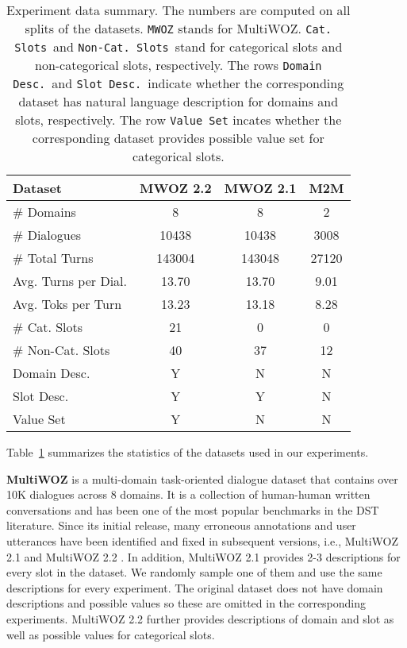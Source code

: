 \documentclass[11pt]{article}
\begin{document}
\begin{table}[t]
    \small
    \centering
    \begin{tabular}{l@{\hskip3pt}c@{\hskip3pt}cc}
    \toprule
        Dataset &  MWOZ 2.2 &  MWOZ 2.1 & M2M  \\
        \midrule
        \# Domains & 8 & 8 & 2 \\
        \# Dialogues & 10438 & 10438 & 3008 \\
        \# Total Turns & 143004 & 143048  & 27120 \\
         Avg. Turns per Dial. & 13.70 & 13.70  & 9.01 \\   
         Avg. Toks per Turn & 13.23 & 13.18  & 8.28 \\   
        \# Cat. Slots & 21 & 0 & 0\\ 
        \# Non-Cat. Slots  & 40 & 37 & 12\\ 
        \midrule
        Domain Desc. & Y & N & N \\
        Slot Desc.   & Y & Y & N \\
        Value Set    & Y & N & N \\
        \bottomrule
    \end{tabular}
    \caption{Experiment data summary. The numbers are computed on all splits of the datasets. \texttt{MWOZ} stands for MultiWOZ. \texttt{Cat. Slots}\ and \texttt{Non-Cat. Slots}\ stand for categorical slots and non-categorical slots, respectively. The rows \texttt{Domain Desc.}\ and \texttt{Slot Desc.}\ indicate whether the corresponding dataset has natural language description for domains and slots, respectively. The row \texttt{Value Set} incates whether the corresponding dataset provides possible value set for categorical slots.
    \label{tab:data_sum}}
\end{table}

Table~\ref{tab:data_sum} summarizes the statistics of the datasets used in our experiments.

\noindent
\textbf{MultiWOZ}
\cite{budzianowski2018multiwoz} is a multi-domain task-oriented dialogue dataset that contains over 10K dialogues across 8 domains.
It is a collection of human-human written conversations and has been one of the most popular benchmarks in the DST literature.
Since its initial release, many erroneous annotations and user utterances have been identified and fixed in subsequent versions, i.e., 
MultiWOZ 2.1 \cite{eric2019multiwoz}
and MultiWOZ 2.2 \cite{zang2020multiwoz}.
In addition, MultiWOZ 2.1 provides 2-3 descriptions for every slot in the dataset. We randomly sample one of them and use the same descriptions for every experiment. The original dataset does not have domain descriptions and possible values so these are omitted in the corresponding experiments.
MultiWOZ 2.2 further provides descriptions of domain and slot as well as possible values for categorical slots. 
\end{document}
